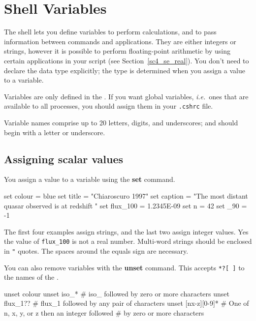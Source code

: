 \documentclass[twoside,11pt,nolof]{starlink}
\providecommand{\latexelsehtml}[2]{#1}
\begin{document}
\newpage
\section{Shell Variables\label{sc4_se_variables}}

The shell lets you define variables to perform calculations, and to
pass information between commands and applications.  They are either
integers or strings, however it is possible to perform floating-point
arithmetic by using certain applications in your script (see
\latexelsehtml{Section~\ref{sc4_se_real}).}{\htmlref{here}{sc4_se_real}).}
You don't need to declare the data type explicitly; the type is
determined when you assign a value to a variable.

Variables are only defined in the .  If you want global variables, \textit{i.e.}\ ones
that are available to all processes, you should assign them in your
\texttt{.cshrc} file.

Variable names comprise up to 20 letters, digits, and underscores;
and should begin with a letter or underscore.

\subsection{Assigning scalar values
\label{sc4_se_assign_scalar}}

You assign a value to a variable using the \textbf{set} command.

\begin{small}
\begin{terminalv}
     set colour = blue
     set title = "Chiaroscuro 1997"
     set caption = "The most distant quasar observed is at redshift "
     set flux_100 = 1.2345E-09
     set n = 42
     set _90 = -1
\end{terminalv}
\end{small}
The first four examples assign strings, and the last two assign integer
values.  Yes the value of \texttt{flux\_100} is not a real number.
Multi-word strings should be enclosed in \texttt{"} quotes.  The spaces
around the equals sign are necessary.

You can also remove variables with the \textbf{unset} command.  This
accepts \texttt{*?[~]}  to
 the names of the
.

\begin{small}
\begin{terminalv}
     unset colour
     unset iso_*             # iso_ followed by zero or more characters
     unset flux_1??          # flux_1 followed by any pair of characters
     unset [nx-z][0-9]*      # One of n, x, y, or z then an integer followed
                             # by zero or more characters
\end{terminalv}
\end{small}
\end{document}
